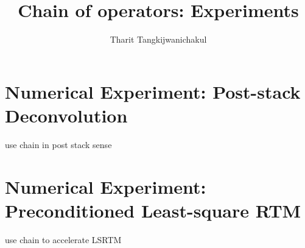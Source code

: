 \title{Chain of operators: Experiments}
\renewcommand{\thefootnote}{\fnsymbol{footnote}}
\relax{}
\author{Tharit Tangkijwanichakul}
\label{ch:chapter-lsrtm}

\maketitle

\section{Numerical Experiment: Post-stack Deconvolution}

use chain in post stack sense

\section{Numerical Experiment: Preconditioned Least-square RTM}

use chain to accelerate LSRTM